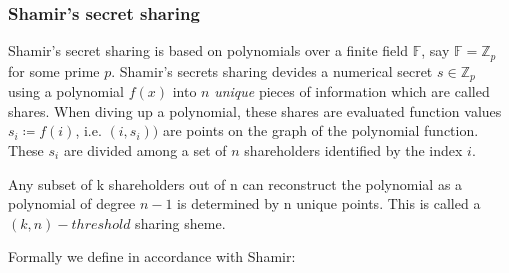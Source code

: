 \documentclass[12pt,a4paper]{scrartcl}				%
\begin{document}
\subsubsection{Shamir's secret sharing}
\label{SSS}
Shamir's secret sharing is based on polynomials over a finite field $\mathbb{F}$, say $\mathbb{F}=\mathbb{Z}_p$ for some prime $p$.
Shamir's secrets sharing devides a numerical secret $s\in\mathbb{Z}_p$ using a polynomial $f(x)$ into $n$ \textit{unique} pieces of information which are called shares. When diving up a polynomial, these shares are evaluated function values $s_i \coloneqq f(i)$, i.e. $(i,s_i))$ are points on the graph of the polynomial function. These $s_i$ are divided among a set of $n$ shareholders identified by the index $i$. 

Any subset of k shareholders out of n can reconstruct the polynomial as a polynomial of degree $n-1$ is determined by n unique points. This is called a $(k,n)-threshold$ sharing sheme. 

Formally we define in accordance with Shamir\cite{shamir1979share}:
\end{document}
